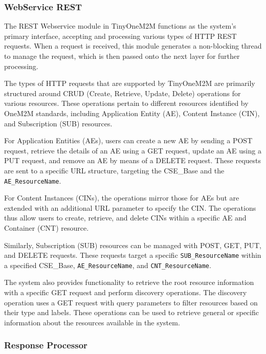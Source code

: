 \documentclass[a4paper,fleqn]{cas-dc}
\begin{document}
\subsubsection{WebService REST}\label{sec:archwebservice}

The REST Webservice module in TinyOneM2M functions as the system's primary interface, accepting and processing various types of HTTP REST requests. When a request is received, this module generates a non-blocking thread to manage the request, which is then passed onto the next layer for further processing.

The types of HTTP requests that are supported by TinyOneM2M are primarily structured around CRUD (Create, Retrieve, Update, Delete) operations for various resources. These operations pertain to different resources identified by OneM2M standards, including Application Entity (AE), Content Instance (CIN), and Subscription (SUB) resources.

For Application Entities (AEs), users can create a new AE by sending a POST request, retrieve the details of an AE using a GET request, update an AE using a PUT request, and remove an AE by means of a DELETE request. These requests are sent to a specific URL structure, targeting the CSE\_Base and the \texttt{AE\_ResourceName}.

For Content Instances (CINs), the operations mirror those for AEs but are extended with an additional URL parameter to specify the CIN. The operations thus allow users to create, retrieve, and delete CINs within a specific AE and Container (CNT) resource.

Similarly, Subscription (SUB) resources can be managed with POST, GET, PUT, and DELETE requests. These requests target a specific \texttt{SUB\_ResourceName} within a specified CSE\_Base, \texttt{AE\_ResourceName}, and \texttt{CNT\_ResourceName}.

The system also provides functionality to retrieve the root resource information with a specific GET request and perform discovery operations. The discovery operation uses a GET request with query parameters to filter resources based on their type and labels. These operations can be used to retrieve general or specific information about the resources available in the system.

\subsubsection{Response Processor} \label{sec:archresponseprocessor}
\end{document}
